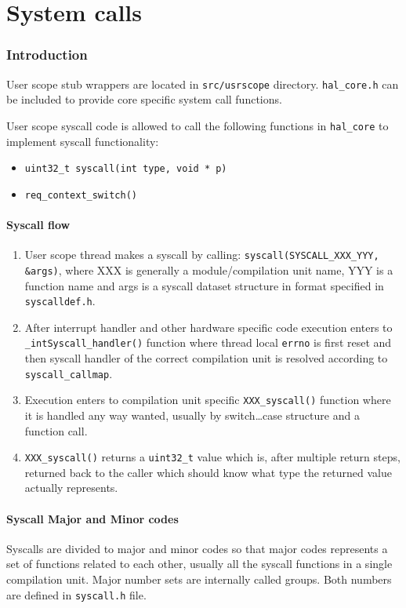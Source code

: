 \part{System calls}

\section{Introduction}
User scope stub wrappers are located in \verb+src/usrscope+ directory.
\verb+hal_core.h+ can be included to provide core specific system call
functions.

User scope syscall code is allowed to call the following functions in
\verb+hal_core+ to implement syscall functionality:

\begin{itemize}
  \item \verb+uint32_t syscall(int type, void * p)+
  \item \verb+req_context_switch()+
\end{itemize}

\subsection{Syscall flow}

\begin{enumerate}
\item User scope thread makes a syscall by calling:
      \verb+syscall(SYSCALL_XXX_YYY, &args)+, where XXX is generally a
      module/compilation unit name, YYY is a function name and args is a
      syscall dataset structure in format specified in \verb+syscalldef.h+.

\item After interrupt handler and other hardware specific code execution enters
      to \verb+_intSyscall_handler()+ function where thread local \verb+errno+
      is first reset and then syscall handler of the correct compilation unit is
      resolved according to \verb+syscall_callmap+.

\item Execution enters to compilation unit specific \verb+XXX_syscall()+
      function where it is handled any way wanted, usually by switch\ldots case
      structure and a function call.

\item \verb+XXX_syscall()+ returns a \verb+uint32_t+ value which is, after
      multiple return steps, returned back to the caller which should know
      what type the returned value actually represents.
\end{enumerate}


\subsection{Syscall Major and Minor codes}

Syscalls are divided to major and minor codes so that major codes represents a
set of functions related to each other, usually all the syscall functions in a
single compilation unit. Major number sets are internally called groups. Both
numbers are defined in \verb+syscall.h+ file.
